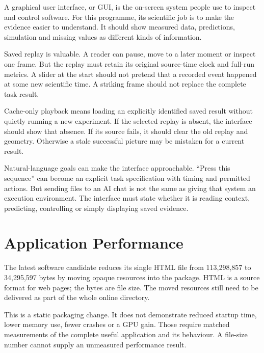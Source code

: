 A graphical user interface, or GUI, is the on-screen system people use to inspect and control software. For this programme, its scientific job is to make the evidence easier to understand. It should show measured data, predictions, simulation and missing values as different kinds of information.\par

Saved replay is valuable. A reader can pause, move to a later moment or inspect one frame. But the replay must retain its original source-time clock and full-run metrics. A slider at the start should not pretend that a recorded event happened at some new scientific time. A striking frame should not replace the complete task result.\par

Cache-only playback means loading an explicitly identified saved result without quietly running a new experiment. If the selected replay is absent, the interface should show that absence. If its source fails, it should clear the old replay and geometry. Otherwise a stale successful picture may be mistaken for a current result.\par

Natural-language goals can make the interface approachable. ``Press this sequence'' can become an explicit task specification with timing and permitted actions. But sending files to an AI chat is not the same as giving that system an execution environment. The interface must state whether it is reading context, predicting, controlling or simply displaying saved evidence.\par

\section{Application Performance}

The latest software candidate reduces its single HTML file from 113,298,857 to 34,295,597 bytes by moving opaque resources into the package. HTML is a source format for web pages; the bytes are file size. The moved resources still need to be delivered as part of the whole online directory.\par

This is a static packaging change. It does not demonstrate reduced startup time, lower memory use, fewer crashes or a GPU gain. Those require matched measurements of the complete useful application and its behaviour. A file-size number cannot supply an unmeasured performance result.\par

